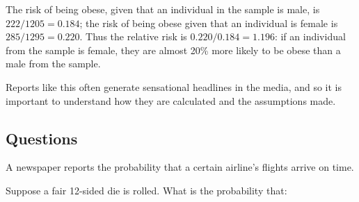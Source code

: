 The risk of being obese, given that an individual in the sample is male, is $ 222/1205 = 0.184 $;
the risk of being obese given that an individual is female is $ 285/1295 = 0.220 $. Thus the relative
risk is $ 0.220/0.184 = 1.196 $: if an individual from the sample is female, they are almost 20\% more
likely to be obese than a male from the sample.

Reports like this often generate sensational headlines in the media, and
so it is important to understand how they are calculated and the assumptions made.

\subsection*{Questions}
\begin{questions}
  \question A newspaper reports the probability that a certain airline's flights arrive on time.
  \question Suppose a fair 12-sided die is rolled. What is the probability that:
\end{questions}
